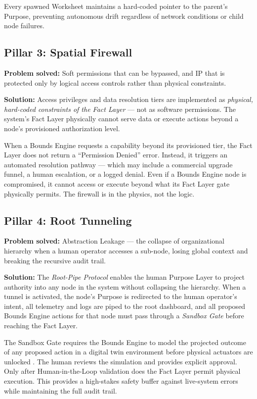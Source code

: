 \documentclass[12pt]{article}
\begin{document}
\vspace{0.8em}

\noindent Every spawned Worksheet maintains a hard-coded pointer to the parent's Purpose, preventing autonomous drift regardless of network conditions or child node failures.

\subsection{Pillar 3: Spatial Firewall}

\textbf{Problem solved:} Soft permissions that can be bypassed, and IP that is protected only by logical access controls rather than physical constraints.

\textbf{Solution:} Access privileges and data resolution tiers are implemented as \textit{physical, hard-coded constraints of the Fact Layer} --- not as software permissions. The system's Fact Layer physically cannot serve data or execute actions beyond a node's provisioned authorization level.

When a Bounds Engine requests a capability beyond its provisioned tier, the Fact Layer does not return a ``Permission Denied'' error. Instead, it triggers an automated resolution pathway --- which may include a commercial upgrade funnel, a human escalation, or a logged denial. Even if a Bounds Engine node is compromised, it cannot access or execute beyond what its Fact Layer gate physically permits. The firewall is in the physics, not the logic.

\subsection{Pillar 4: Root Tunneling}

\textbf{Problem solved:} Abstraction Leakage --- the collapse of organizational hierarchy when a human operator accesses a sub-node, losing global context and breaking the recursive audit trail.

\textbf{Solution:} The \textit{Root-Pipe Protocol} enables the human Purpose Layer to project authority into any node in the system without collapsing the hierarchy. When a tunnel is activated, the node's Purpose is redirected to the human operator's intent, all telemetry and logs are piped to the root dashboard, and all proposed Bounds Engine actions for that node must pass through a \textit{Sandbox Gate} before reaching the Fact Layer.

The Sandbox Gate requires the Bounds Engine to model the projected outcome of any proposed action in a digital twin environment before physical actuators are unlocked \cite{leveson2011}. The human reviews the simulation and provides explicit approval. Only after Human-in-the-Loop validation does the Fact Layer permit physical execution. This provides a high-stakes safety buffer against live-system errors while maintaining the full audit trail.
\end{document}
